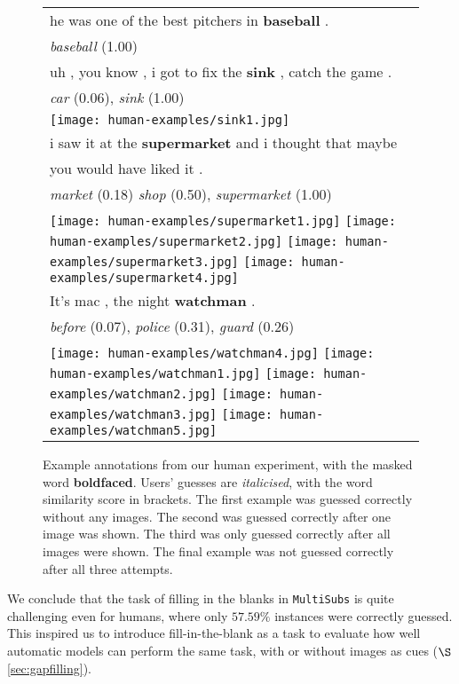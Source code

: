 \documentclass[twocolumn]{svjour3}          \smartqed  \usepackage{graphicx}
\newcommand{\multisubs}{\texttt{MultiSubs}\xspace}
\begin{document}
\begin{figure}[t]
    \centering
\begin{tabular}{l}
             he was one of the best pitchers in  \textbf{baseball} .\\
        \textit{baseball} (1.00)\\
         \midrule
         uh , you know , i got to fix the \textbf{sink} , catch the game .\\
         \textit{car} (0.06), \textit{sink} (1.00) \\
         \texttt{[image: human-examples/sink1.jpg]} \\        
         \midrule
         i saw it at the \textbf{supermarket} and i thought that maybe \\you would have liked it .\\
         \textit{market} (0.18) \textit{shop} (0.50), \textit{supermarket} (1.00)\\   
         \texttt{[image: human-examples/supermarket1.jpg]}     
         \texttt{[image: human-examples/supermarket2.jpg]}             
         \texttt{[image: human-examples/supermarket3.jpg]} \texttt{[image: human-examples/supermarket4.jpg]} \\ \midrule
         It's mac , the night \textbf{watchman} .\\
         \textit{before} (0.07), \textit{police} (0.31), \textit{guard} (0.26)\\
         \texttt{[image: human-examples/watchman4.jpg]}
         \texttt{[image: human-examples/watchman1.jpg]}
         \texttt{[image: human-examples/watchman2.jpg]}         
         \texttt{[image: human-examples/watchman3.jpg]}
         \texttt{[image: human-examples/watchman5.jpg]}         
    \end{tabular}
\caption{Example annotations from our human experiment, with the masked word \textbf{boldfaced}. Users' guesses are \textit{italicised}, with the word similarity score in brackets. The first example was guessed correctly without any images. The second was guessed correctly after one image was shown. The third  was only guessed correctly after all images were shown. The final example was not guessed correctly after all three attempts.}
    \label{fig:human-example}
\end{figure}

We conclude that the task of filling in the blanks in \multisubs is quite challenging even for humans, where only $57.59\%$ instances were correctly guessed. This inspired us to introduce fill-in-the-blank as a task to evaluate how well automatic models can perform the same task, with or without images as cues ($\S$\ref{sec:gapfilling}).
\end{document}
